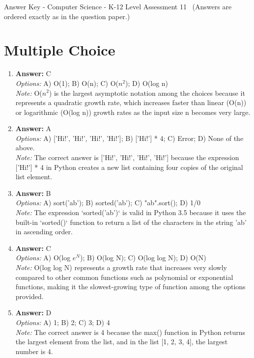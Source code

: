 \documentclass[12pt]{article}
\begin{document}
\begin{center}
Answer Key - Computer Science - K-12 Level Assessment 11 \
\small (Answers are ordered exactly as in the question paper.)
\end{center}

\section*{Multiple Choice}
\begin{enumerate}[label=\arabic*.]
\item \textbf{Answer:} C
\\ \textit{Options:} A) O(1); B) O(n); C) O($n^2$); D) O(log n)
\\ \textit{Note:} O($n^2$) is the largest asymptotic notation among the choices because it represents a quadratic growth rate, which increases faster than linear (O(n)) or logarithmic (O(log n)) growth rates as the input size n becomes very large.
\item \textbf{Answer:} A
\\ \textit{Options:} A) ['Hi!', 'Hi!', 'Hi!', 'Hi!']; B) ['Hi!'] * 4; C) Error; D) None of the above.
\\ \textit{Note:} The correct answer is ['Hi!', 'Hi!', 'Hi!', 'Hi!'] because the expression ['Hi!'] * 4 in Python creates a new list containing four copies of the original list element.
\item \textbf{Answer:} B
\\ \textit{Options:} A) sort('ab'); B) sorted('ab'); C) "ab".sort(); D) 1/0
\\ \textit{Note:} The expression `sorted('ab')` is valid in Python 3.5 because it uses the built-in `sorted()` function to return a list of the characters in the string 'ab' in ascending order.
\item \textbf{Answer:} C
\\ \textit{Options:} A) O(log $e^N$); B) O(log N); C) O(log log N); D) O(N)
\\ \textit{Note:} O(log log N) represents a growth rate that increases very slowly compared to other common functions such as polynomial or exponential functions, making it the slowest-growing type of function among the options provided.
\item \textbf{Answer:} D
\\ \textit{Options:} A) 1; B) 2; C) 3; D) 4
\\ \textit{Note:} The correct answer is 4 because the max() function in Python returns the largest element from the list, and in the list [1, 2, 3, 4], the largest number is 4.
\end{enumerate}
\end{document}
